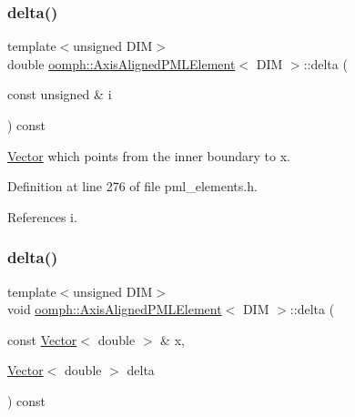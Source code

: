 \subsubsection{\texorpdfstring{delta()}{delta()}\hspace{0.1cm}{\footnotesize\ttfamily [1/2]}}
{\footnotesize\ttfamily template$<$unsigned D\+IM$>$ \\
double \hyperlink{classoomph_1_1AxisAlignedPMLElement}{oomph\+::\+Axis\+Aligned\+P\+M\+L\+Element}$<$ D\+IM $>$\+::delta (\begin{DoxyParamCaption}\item[{const unsigned \&}]{i }\end{DoxyParamCaption}) const\hspace{0.3cm}{\ttfamily [inline]}}



\hyperlink{classoomph_1_1Vector}{Vector} which points from the inner boundary to x. 



Definition at line 276 of file pml\+\_\+elements.\+h.



References i.

\mbox{\label{classoomph_1_1AxisAlignedPMLElement_a37d292c06ab74db30dcb6e8f7cea4033}} 
\subsubsection{\texorpdfstring{delta()}{delta()}\hspace{0.1cm}{\footnotesize\ttfamily [2/2]}}
{\footnotesize\ttfamily template$<$unsigned D\+IM$>$ \\
void \hyperlink{classoomph_1_1AxisAlignedPMLElement}{oomph\+::\+Axis\+Aligned\+P\+M\+L\+Element}$<$ D\+IM $>$\+::delta (\begin{DoxyParamCaption}\item[{const \hyperlink{classoomph_1_1Vector}{Vector}$<$ double $>$ \&}]{x,  }\item[{\hyperlink{classoomph_1_1Vector}{Vector}$<$ double $>$}]{delta }\end{DoxyParamCaption}) const\hspace{0.3cm}{\ttfamily [inline]}}



